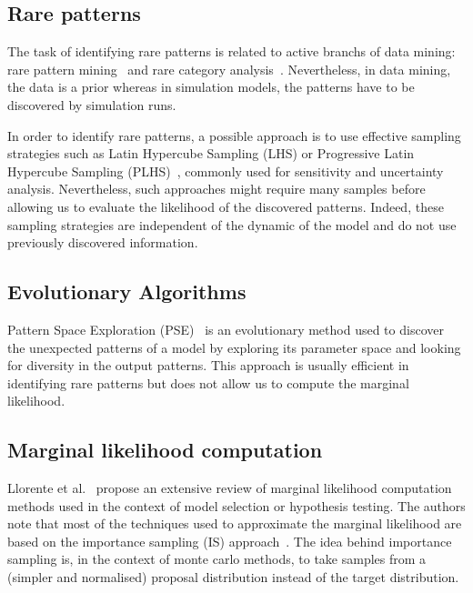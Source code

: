 \documentclass[10pt,letterpaper]{article}
\theoremstyle{definition}
\theoremstyle{remark}
\begin{document}
\subsection*{Rare patterns}

The task of identifying rare patterns is related to active branchs of data mining: rare pattern mining~\cite{borah2019rare} and rare category analysis~\cite{Zhou2023}.
Nevertheless, in data mining, the data is a prior whereas in simulation models, the patterns have to be discovered by simulation runs.

In order to identify rare patterns, a possible approach is to use effective sampling strategies such as Latin Hypercube Sampling (LHS) or Progressive Latin Hypercube Sampling (PLHS)~\cite{SHEIKHOLESLAMI2017109}, commonly used for sensitivity and uncertainty analysis.
Nevertheless, such approaches might require many samples before allowing us to evaluate the likelihood of the discovered patterns.
Indeed, these sampling strategies are independent of the dynamic of the model and do not use previously discovered information.

\subsection*{Evolutionary Algorithms}
Pattern Space Exploration (PSE)~\cite{cherel2015} is an evolutionary method used to discover the unexpected patterns of a model by exploring its parameter space and looking for diversity in the output patterns.
This approach is usually efficient in identifying rare patterns but does not allow us to compute the marginal likelihood.

\subsection*{Marginal likelihood computation}

Llorente et al.~\cite{llorente2023marginal} propose an extensive review of marginal likelihood computation methods used in the context of model selection or hypothesis testing.
The authors note that most of the techniques used to approximate the marginal likelihood are based on the importance sampling (IS) approach~\cite{tokdar2010importance}.
The idea behind importance sampling is, in the context of monte carlo methods, to take samples from a (simpler and normalised) proposal distribution instead of the target distribution.
\end{document}
